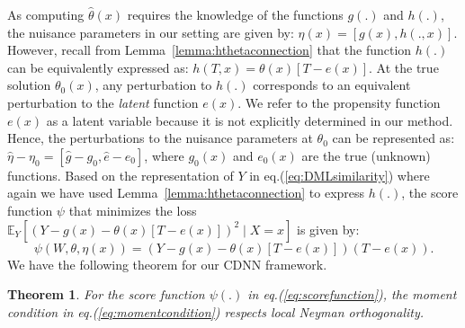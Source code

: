 \documentclass[sigconf]{acmart}
\theoremstyle{plain}
\newtheorem{theorem}{Theorem}[section]
\numberwithin{equation}{section}
\begin{document}
As computing $\hat{\theta}(x)$ requires the knowledge of the functions $g(.)$ and $h(.)$, the nuisance parameters in our setting are given by: $\eta(x) = \left[g(x), h(.,x)\right]$. However, recall from Lemma~\ref{lemma:hthetaconnection} that the function $h(.)$ can be equivalently expressed as: $h(T,x) = \theta(x) [T-e(x)]$. At the true solution $\theta_0(x)$, any perturbation to $h(.)$ corresponds to an equivalent perturbation to the \emph{latent} function $e(x)$. We refer to the propensity function $e(x)$ as a latent variable because it is not explicitly determined in our method. Hence, the perturbations to the nuisance parameters at $\theta_0$ can be represented as: $\hat{\eta} - \eta_0 = \left[\hat{g} - g_0, \hat{e} - e_0\right]$, where $g_0(x)$ and $e_0(x)$ are the true (unknown) functions. Based on the representation of $Y$ in eq.(\ref{eq:DMLsimilarity}) where again we have used Lemma~\ref{lemma:hthetaconnection} to express $h(.)$, the score function $\psi$ that minimizes the loss $\mathbb{E}_Y \left[ \left(Y-g(x) - \theta(x)[T-e(x)]\right)^2 \mid X=x \right]$ is given by:
\begin{equation}
\label{eq:scorefunction}
\psi\left(W,\theta,\eta(x)\right) = \left(Y - g(x) - \theta(x)[T-e(x)]\right) \left(T-e(x)\right).
\end{equation}
We have the following theorem for our CDNN framework.
\begin{theorem}
For the score function $\psi(.)$ in eq.(\ref{eq:scorefunction}), the moment condition in eq.(\ref{eq:momentcondition}) respects local Neyman orthogonality. 
\end{theorem}
\end{document}
